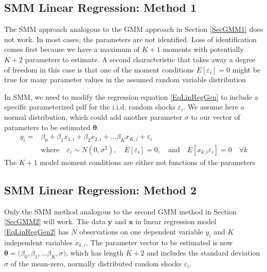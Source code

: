 \documentclass[letterpaper,12pt]{article}
\theoremstyle{definition}
\newcommand\ve{\varepsilon}
\begin{document}
  \subsection{SMM Linear Regression: Method 1}\label{SecSMM1}

    The SMM approach analogous to the GMM approach in Section \ref{SecGMM1} does not work. In most cases, the parameters are not identified. Loss of identification comes first because we have a maximum of $K+1$ moments with potentially $K+2$ parameters to estimate. A second characteristic that takes away a degree of freedom in this case is that one of the moment conditions $E[\ve_i]=0$ might be true for many parameter values in the assumed random variable distribution

    In SMM, we need to modify the regression equation \eqref{EqLinRegGen} to include a specific parameterized pdf for the i.i.d. random shocks $\ve_i$. We assume here a normal distribution, which could add another parameter $\sigma$ to our vector of parameters to be estimated $\bm{\theta}$.
    \begin{equation}\label{EqLinRegGen2}
      \begin{split}
        y_i = &\beta_0 + \beta_1 x_{1,i} + \beta_2 x_{2,i} + ... \beta_K x_{K,i} + \ve_i \\
        &\text{where}\quad \ve_i\sim N(0,\sigma^2), \quad E[\ve_i]=0,\quad\text{and}\quad E[x_{k,i}\ve_i]=0 \quad\forall k
      \end{split}
    \end{equation}
    The $K+1$ model moment conditions are either not functions of the parameters


  \subsection{SMM Linear Regression: Method 2}\label{SecSMM2}

    Only the SMM method analogous to the second GMM method in Section \ref{SecGMM2} will work. The data $\bm{y}$ and $\bm{x}$ in linear regression model \eqref{EqLinRegGen2} has $N$ observations on one dependent variable $y_i$ and $K$ independent variables $x_{k,i}$. The parameter vector to be estimated is now $\bm{\theta}=\bigl(\beta_0,\beta_1,...\beta_K, \sigma\bigr)$, which has length $K+2$ and includes the standard deviation $\sigma$ of the mean-zero, normally distributed random shocks $\ve_i$.
\end{document}

